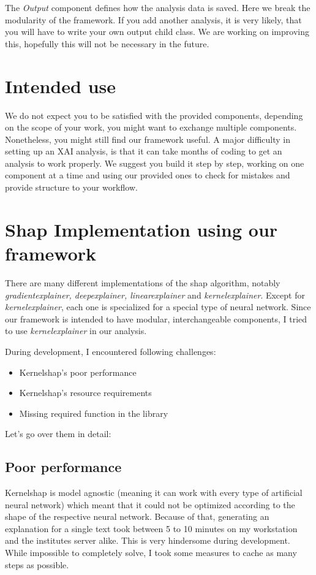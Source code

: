The \textit{Output} component defines how the analysis data is saved. Here we break the modularity of the framework. If you add another analysis, it is very likely, that you will have to write your own output child class. We are working on improving this, hopefully this will not be necessary in the future.

\section{Intended use}

We do not expect you to be satisfied with the provided components, depending on the scope of your work, you might want to exchange multiple components. Nonetheless, you might still find our framework useful. A major difficulty in setting up an XAI analysis, is that it can take months of coding to get an analysis to work properly. We suggest you build it step by step, working on one component at a time and using our provided ones to check for mistakes and provide structure to your workflow.

\section{Shap Implementation using our framework}

There are many different implementations of the shap algorithm, notably \textit{gradientexplainer, deepexplainer, linearexplainer} and \textit{kernelexplainer}. Except for \textit{kernelexplainer}, each one is specialized for a special type of neural network. Since our framework is intended to have modular, interchangeable components, I tried to use \textit{kernelexplainer} in our analysis.

During development, I encountered following challenges:
\begin{itemize}
    \item Kernelshap's poor performance
    \item Kernelshap's resource requirements
    \item Missing required function in the library
\end{itemize}

Let's go over them in detail:
\subsection{Poor performance}

Kernelshap is model agnostic (meaning it can work with every type of artificial neural network) which meant that it could not be optimized according to the shape of the respective neural network. Because of that, generating an explanation for a single text took between 5 to 10 minutes on my workstation and the institutes server alike. This is very hindersome during development. While impossible to completely solve, I took some measures to cache as many steps as possible.

